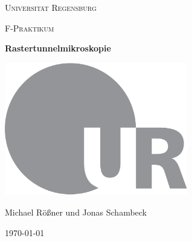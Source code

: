\begin{titlepage}
	\centering
	{\scshape \LARGE Universität Regensburg \par}
	\vspace{1cm}
	{\scshape\Large F-Praktikum\par}
	\vspace{1.5cm}
	{\huge\bfseries Rastertunnelmikroskopie\par}
	\vspace{2cm}
	\includegraphics[width=0.6\textwidth]{ur_logo.png}\par
	\vfill
	{\large Michael Rößner und Jonas Schambeck\par}

	\vfill

	{\large \today\par}
\end{titlepage}
